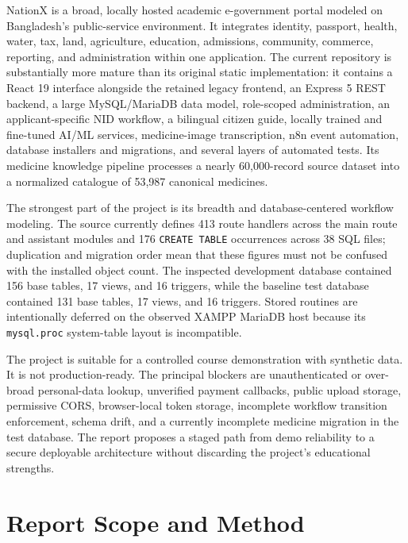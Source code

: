 \documentclass[12pt,a4paper,oneside]{report}
\newcommand{\code}[1]{\texttt{#1}}
\begin{document}
NationX is a broad, locally hosted academic e-government portal modeled on Bangladesh's
public-service environment. It integrates identity, passport, health, water, tax, land,
agriculture, education, admissions, community, commerce, reporting, and administration
within one application. The current repository is substantially more mature than its original
static implementation: it contains a React 19 interface alongside the retained legacy frontend,
an Express 5 REST backend, a large MySQL/MariaDB data model, role-scoped administration,
an applicant-specific NID workflow, a bilingual citizen guide, locally trained and fine-tuned
AI/ML services, medicine-image transcription, n8n event automation, database installers and
migrations, and several layers of automated tests. Its medicine knowledge pipeline processes a
nearly 60,000-record source dataset into a normalized catalogue of 53,987 canonical medicines.

The strongest part of the project is its breadth and database-centered workflow modeling. The
source currently defines 413 route handlers across the main route and assistant modules and 176
\code{CREATE TABLE} occurrences across 38 SQL files; duplication and migration order mean that
these figures must not be confused with the installed object count. The inspected development
database contained 156 base tables, 17 views, and 16 triggers, while the baseline test database
contained 131 base tables, 17 views, and 16 triggers. Stored routines are intentionally deferred
on the observed XAMPP MariaDB host because its \code{mysql.proc} system-table layout is
incompatible.

The project is suitable for a controlled course demonstration with synthetic data. It is not
production-ready. The principal blockers are unauthenticated or over-broad personal-data lookup,
unverified payment callbacks, public upload storage, permissive CORS, browser-local token storage,
incomplete workflow transition enforcement, schema drift, and a currently incomplete medicine
migration in the test database. The report proposes a staged path from demo reliability to a
secure deployable architecture without discarding the project's educational strengths.

\chapter*{Report Scope and Method}
\end{document}
